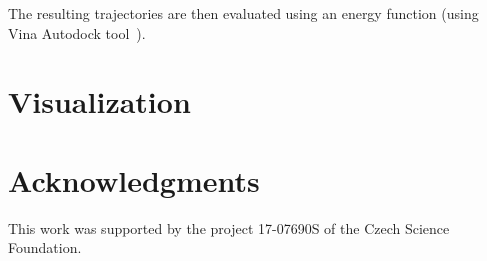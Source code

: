 \documentclass[conference]{IEEEtran}
\begin{document}
The resulting trajectories are then evaluated using an energy function (using Vina Autodock tool~\cite{trott2009autodock}).


\section{Visualization}

\section*{Acknowledgments}
This work was supported by the project 17-07690S of the Czech Science Foundation.




\end{document}
